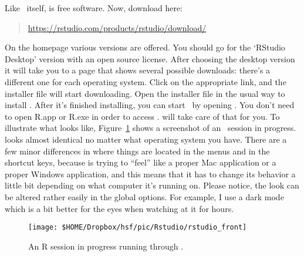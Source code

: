 Like \R\ itself, \Rstudio is free software. Now, download \Rstudio here:
\begin{quote}
	\url{https://rstudio.com/products/rstudio/download/}
\end{quote}
On the homepage various versions are offered. You should go for the `RStudio Desktop' version with an open source license. After choosing the desktop version it will take you to a page that shows several possible downloads: there's a different one for each operating system. Click on the appropriate link, and the \Rstudio installer file will start downloading. 
Open the installer file in the usual way to install \Rstudio. After it's finished installing, you can start \R\ by opening \Rstudio.  You don't need to open R.app or R.exe in order to access \R. \Rstudio will take care of that for you. To illustrate what \Rstudio looks like, Figure~\ref{fig:rstudio} shows a screenshot of an \R\ session in progress. \Rstudio looks almost identical no matter what operating system you have. There are a few minor differences in where things are located in the menus and in the shortcut keys, because \Rstudio is trying to ``feel'' like a proper Mac application or a proper Windows application, and this means that it has to change its behavior a little bit depending on what computer it's running on. Please notice, the look can be altered rather easily in the global options. For example, I use a dark mode which is a bit better for the eyes when watching at it for hours.





\begin{figure}[!t]
	\begin{center}
		\texttt{[image: \$HOME/Dropbox/hsf/pic/Rstudio/rstudio\_front]}
	\end{center}
	\caption{An R session in progress running through \Rstudio.}
	\label{fig:rstudio}
\end{figure}

